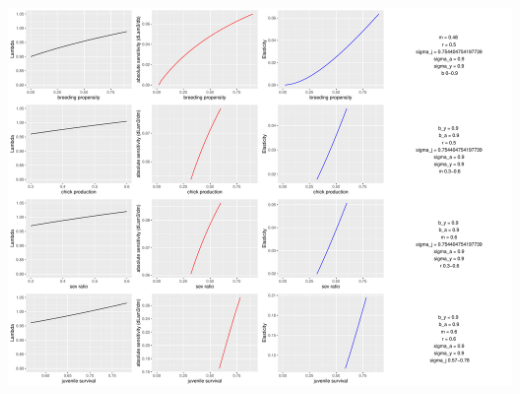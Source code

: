 \documentclass[
  letterpaper,
  DIV=11,
  numbers=noendperiod]{scrartcl}
\begin{document}
\includegraphics{sensitivity_files/figure-pdf/unnamed-chunk-13-1.pdf}
\end{document}
